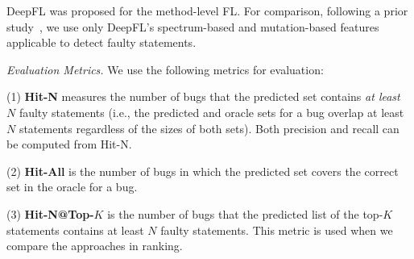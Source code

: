 
DeepFL was proposed for the method-level FL. For comparison, following
a prior study~\cite{icse21-fl}, we use only DeepFL's spectrum-based
and mutation-based features applicable to detect faulty statements.

\vspace{1pt}
\emph{Evaluation Metrics.}  
We use the following metrics for evaluation:

(1) {\bf Hit-N} measures the number of bugs that the predicted set
contains {\em at least} $N$ faulty statements (i.e., the predicted 
and oracle sets for a bug overlap at least $N$ statements regardless
of the sizes of both sets). Both precision and recall can be computed
from Hit-N.

(2) {\bf Hit-All} is the number of bugs in which the predicted set
covers the correct set in the oracle for a bug.




(3) {\bf Hit-N@Top-$K$} is the number of bugs that the predicted list
of the top-$K$ statements contains at least $N$ faulty
statements. This metric is used when we compare the approaches in
ranking.






